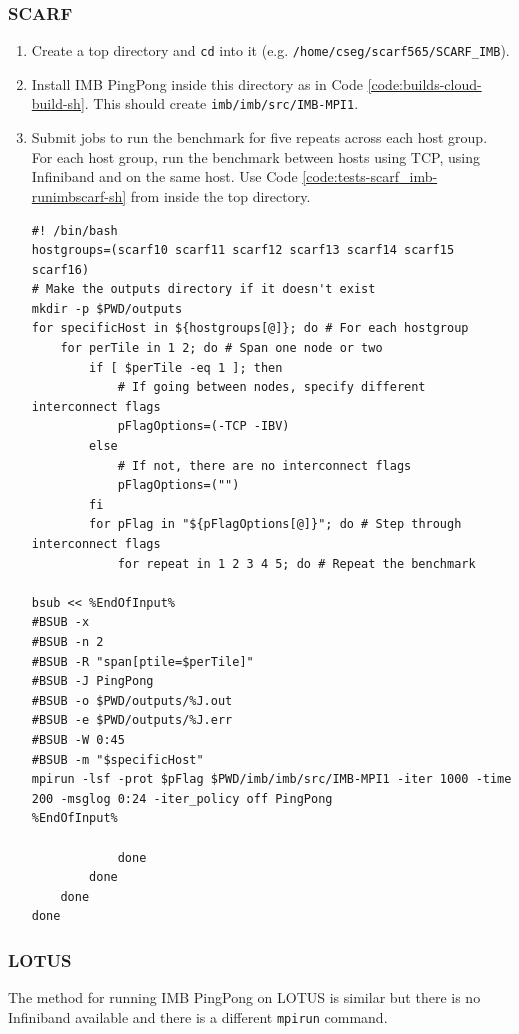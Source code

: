 \documentclass{article}
\newenvironment{code}{\captionsetup{type=listing}}{}
\begin{document}
        \subsubsection{SCARF}
            \begin{enumerate}
                \item Create a top directory and \verb|cd| into it (e.g. \verb|/home/cseg/scarf565/SCARF_IMB|).
                \item Install IMB PingPong inside this directory as in Code \ref{code:builds-cloud-build-sh}. This should create \verb|imb/imb/src/IMB-MPI1|.
                \item Submit jobs to run the benchmark for five repeats across each host group. For each host group, run the benchmark between hosts using TCP, using Infiniband and on the same host. Use Code \ref{code:tests-scarf_imb-runimbscarf-sh} from inside the top directory.
                    \begin{code}
                    \label{code:tests-scarf_imb-runimbscarf-sh}
                    \begin{verbatim}
#! /bin/bash
hostgroups=(scarf10 scarf11 scarf12 scarf13 scarf14 scarf15 scarf16)
# Make the outputs directory if it doesn't exist
mkdir -p $PWD/outputs
for specificHost in ${hostgroups[@]}; do # For each hostgroup
    for perTile in 1 2; do # Span one node or two
        if [ $perTile -eq 1 ]; then
            # If going between nodes, specify different interconnect flags
            pFlagOptions=(-TCP -IBV)
        else
            # If not, there are no interconnect flags
            pFlagOptions=("")
        fi
        for pFlag in "${pFlagOptions[@]}"; do # Step through interconnect flags
            for repeat in 1 2 3 4 5; do # Repeat the benchmark

bsub << %EndOfInput%
#BSUB -x
#BSUB -n 2
#BSUB -R "span[ptile=$perTile]"
#BSUB -J PingPong
#BSUB -o $PWD/outputs/%J.out
#BSUB -e $PWD/outputs/%J.err
#BSUB -W 0:45
#BSUB -m "$specificHost"
mpirun -lsf -prot $pFlag $PWD/imb/imb/src/IMB-MPI1 -iter 1000 -time 200 -msglog 0:24 -iter_policy off PingPong
%EndOfInput%

            done
        done
    done
done

                \end{verbatim}
                \end{code}
            \end{enumerate}
        \subsubsection{LOTUS}
            The method for running IMB PingPong on LOTUS is similar but there is no Infiniband available and there is a different \verb|mpirun| command.
\end{document}
